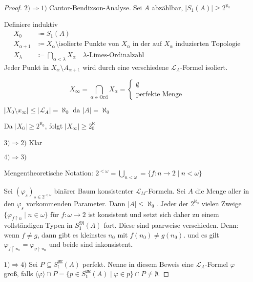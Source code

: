 \documentclass[12pt,parskip=full]{scrartcl}
\newcommand{\abs}[1]{{\left| #1 \right|}}
\newcommand{\heading}{\underline}
\theoremstyle{definition}
\begin{document}
	\begin{proof}
		\heading{$2) \Rightarrow 1)$} Cantor-Bendixson-Analyse. Sei $A$ abzählbar, $\abs{S_1(A)} \geq 2^{\aleph_0}$
		
		Definiere induktiv
		\begin{align*}
			X_0 &\coloneqq S_1(A) \\
			X_{\alpha + 1} &\coloneqq X_\alpha \setminus \text{isolierte Punkte von $X_\alpha$ in der auf $X_\alpha$ induzierten Topologie} \\
			X_\lambda &\coloneqq \bigcap_{\alpha < \lambda} X_\alpha \quad \text{$\lambda$-Limes-Ordinalzahl}
		\end{align*}
		Jeder Punkt in $X_\alpha \setminus A_{\alpha + 1}$ wird durch eine verschiedene $\mathcal{L}_A$-Formel isoliert.
		
		\begin{equation*}
			X_\infty = \bigcap_{\alpha \in \text{Ord}} X_\alpha = \begin{cases}
				\emptyset \\
				\text{perfekte Menge}
			\end{cases}
		\end{equation*}
		
		$\abs{X_0 \setminus x_\infty} \leq \abs{\mathcal{L}_A} = \aleph_0 \text{ da } \abs{A} = \aleph_0$
		
		Da $\abs{X_0} \geq 2^{\aleph_0}$, folgt $\abs{X_\infty} \geq 2^\aleph_0$
		
		\heading{$3) \Rightarrow 2)$} Klar
		
		\heading{$4) \Rightarrow 3)$}
		
		Mengentheoretische Notation: $2^{<\omega} = \bigcup_{n < \omega} = \{ f: n \to 2 \mid n < \omega \}$
		
		Sei $(\varphi_s)_{s \in 2^{<\omega}}$ binärer Baum konsistenter $\mathcal{L}_M$-Formeln. Sei $A$ die Menge aller in den $\varphi_s$ vorkommenden Parameter. Dann $\abs{A} \leq \aleph_0$. Jeder der $2^{\aleph_0}$ vielen Zweige $\{ \varphi_{f \upharpoonright n} \mid n \in \omega \}$ für $f: \omega \to 2$ ist konsistent und setzt sich daher zu einem vollständigen Typen in $S_1^\mathfrak{M}(A)$ fort. 
		Diese sind paarweise verschieden. Denn: wenn $f \neq g$, dann gibt es kleinstes $n_0$ mit $f(n_0) \neq g(n_0)$. und es gilt $\varphi_{f \upharpoonright n_0} = \varphi_{g \upharpoonright n_0}$ und beide sind inkonsistent.
		
		\heading{$1) \Rightarrow 4)$}  Sei $P \subseteq S_1^\mathfrak{M}(A)$ perfekt. Nenne in diesem Beweis eine $\mathcal{L}_A$-Formel $\varphi$ groß, falls $\langle \varphi \rangle \cap P = \{ p \in S_1^\mathfrak{M}(A) \mid \varphi \in p \} \cap P \neq \emptyset$.
		

\end{proof}
\end{document}
